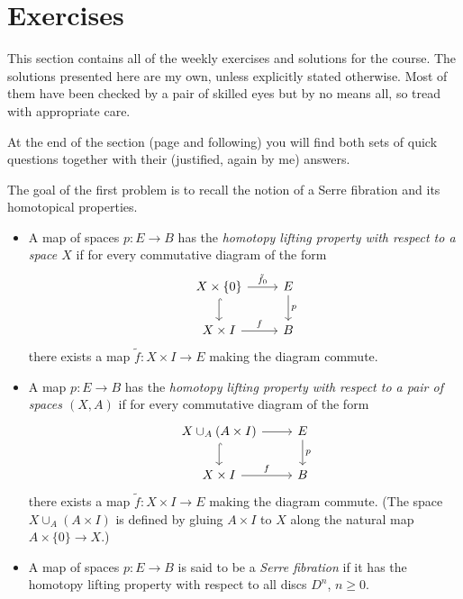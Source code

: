 \section{Exercises}
This section contains all of the weekly exercises and solutions for the course.
The solutions presented here are my own, unless explicitly stated otherwise.
Most of them have been checked by a pair of skilled eyes but by no means all, so tread with appropriate care.

At the end of the section (page \pageref{sect:quickquest} and following) you will find both sets of quick questions together with their (justified, again by me) answers.

\begin{exercise}\label{ex:serrefib}
	The goal of the first problem is to recall the notion of a Serre fibration and its homotopical properties.
	\begin{itemize}
		\item A map of spaces $p\colon E \to B$ has the \emph{homotopy lifting property with respect to a space $X$} if for every commutative diagram of the form
			\begin{equation*}
				\begin{tikzcd}
					X \times \{0\} 
							\ar[r, "\tilde{f}_0"]
							\ar[d, hook]
						& E
							\ar[d, "p"]
					\\
					X \times I
							\ar[r, "f"]
						& B
				\end{tikzcd}
			\end{equation*}
			there exists a map $\tilde{f}\colon X \times I \to E$ making the diagram commute.
		\item A map $p\colon E \to B$ has the \emph{homotopy lifting property with respect to a pair of spaces $(X, A)$} if for every commutative diagram of the form
			\begin{equation*}
				\begin{tikzcd}
					X \cup_A (A \times I)
							\ar[r]
							\ar[d, hook]
						& E
							\ar[d, "p"]
					\\
					X \times I
							\ar[r, "f"]
						& B
				\end{tikzcd}
			\end{equation*}
			there exists a map $\tilde{f}\colon X \times I \to E$ making the diagram commute. (The space $X \cup_A (A \times I)$ is defined by gluing $A \times I$ to $X$ along the natural map $A \times \{0\} \to X$.)
		\item A map of spaces $p\colon E \to B$ is said to be a \emph{Serre fibration} if it has the homotopy lifting property with respect to all discs $D^n$, $n \geq 0$.

\end{itemize}
\end{exercise}
